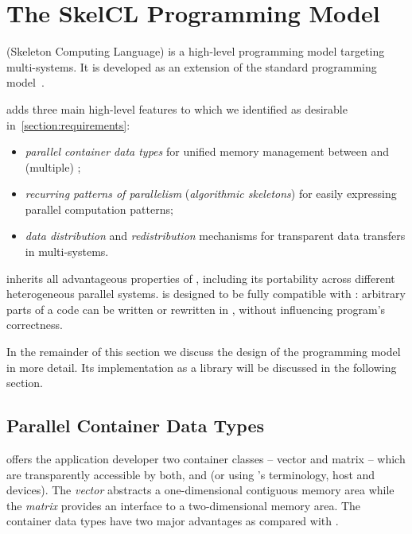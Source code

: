 \section{The SkelCL Programming Model}
\label{section:skelcl-programming-model}
\SkelCL (Skeleton Computing Language) is a high-level programming model targeting multi-\GPU systems.
It is developed as an extension of the standard \OpenCL programming model~\cite{OpenCL}.

\SkelCL adds three main high-level features to \OpenCL which we identified as desirable in~\autoref{section:requirements}:

\begin{itemize}
  \item \emph{parallel container data types} for unified memory management between \CPU and (multiple) \GPUs;
  \item \emph{recurring patterns of parallelism} (\aka \emph{algorithmic skeletons}) for easily expressing parallel computation patterns;
  \item \emph{data distribution} and \emph{redistribution} mechanisms for transparent data transfers in multi-\GPU systems.
\end{itemize}

\noindent
\SkelCL inherits all advantageous properties of \OpenCL, including its portability across different heterogeneous parallel systems.
\SkelCL is designed to be fully compatible with \OpenCL: arbitrary parts of a \SkelCL code can be written or rewritten in \OpenCL, without influencing program's correctness.

\noindent
In the remainder of this section we discuss the design of the \SkelCL programming model in more detail.
Its implementation as a \Cpp library will be discussed in the following section.

\subsection{Parallel Container Data Types}
\label{section:skelcl-programming-model:container}
\SkelCL offers the application developer two container classes -- vector and matrix -- which are transparently accessible by both, \CPU and \GPUs (or using \OpenCL's terminology, host and devices).
The \emph{vector} abstracts a one-dimensional contiguous memory area while the \emph{matrix} provides an interface to a two-dimensional memory area.
The \SkelCL container data types have two major advantages as compared with \OpenCL.

